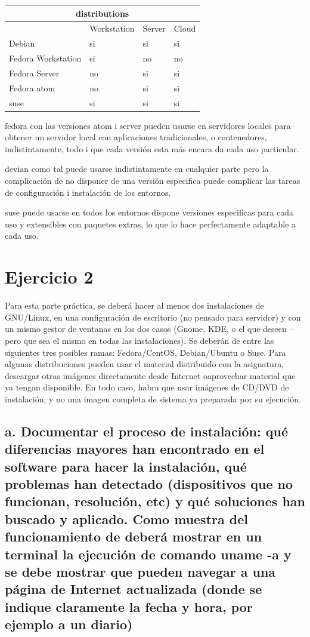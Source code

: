 \documentclass[preprint,11pt]{elsarticle}
\begin{document}
\begin{tabular}{ |p{4cm}||p{3cm}|p{3cm}|p{3cm}|  }
 \hline
 \multicolumn{4}{|c|}{distributions} \\
 \hline
  &Workstation  &Server  &Cloud \\
 \hline
Debian &si &si &si\\
Fedora Workstation  &si &no &no\\
Fedora Server &no &si &si\\
Fedora atom &no &si &si \\
suse &si &si &si \\
 \hline
\end{tabular}
\bigskip 

fedora con las versiones atom i server pueden usarse en servidores locales para obtener un servidor local con aplicaciones tradicionales, o contenedores, indistintamente, todo i que cada versión esta más encara da cada uso particular.\bigskip

devian como tal puede usarse indistintamente en cualquier parte pero la complicación de no disponer de una versión especifica puede complicar las tareas de configuración i instalación de los entornos.\bigskip

suse puede usarse en todos los entornos dispone versiones especificas para cada uso y extensibles con paquetes extras, lo que lo hace perfectamente adaptable a cada uso.\bigskip

\clearpage
\section{Ejercicio 2}
Para esta parte práctica, se deberá hacer al menos dos instalaciones de GNU/Linux, en una configuración de escritorio (no pensado para servidor) y con un mismo gestor de ventanas en los dos casos (Gnome, KDE, o el que deseen – pero que sea el mismo en todas las instalaciones). Se deberán de entre las siguientes tres posibles ramas: Fedora/CentOS, Debian/Ubuntu o Suse. Para algunas distribuciones pueden usar el material distribuido con la asignatura, descargar otras imágenes directamente desde Internet oaprovechar material que ya tengan disponible. En todo caso, habra que usar imágenes de CD/DVD de instalación, y no una imagen completa de sistema ya preparada por su ejecución.\bigskip

\subsection{a. Documentar el proceso de instalación: qué diferencias mayores han encontrado en el software para hacer la instalación, qué problemas han detectado (dispositivos que no funcionan, resolución, etc) y qué soluciones han buscado y aplicado. Como muestra del funcionamiento de deberá mostrar en un terminal la ejecución de comando uname -a y se debe mostrar que pueden navegar a una página de Internet actualizada (donde se indique claramente la fecha y hora, por ejemplo a un diario) }
\end{document}
